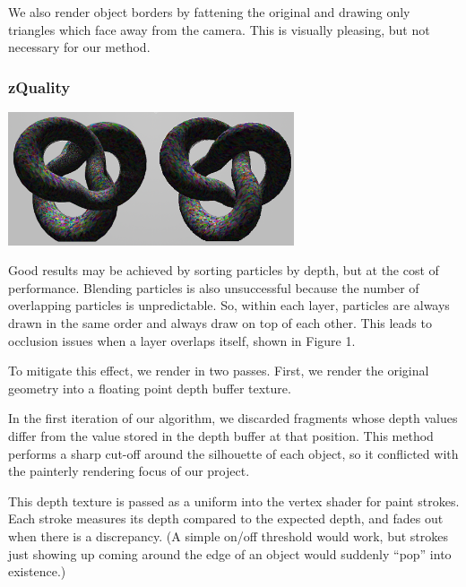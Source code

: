 \documentclass[conference]{acmsiggraph}
\begin{document}
We also render object borders by fattening the original and drawing only
triangles which face away from the camera. This is visually pleasing, but not
necessary for our method.


\subsubsection{zQuality}


\begin{minipage}{\linewidth}%
  \includegraphics[width=3.32in]{images/torus_depth_test_demo}
  \label{visina8}
\end{minipage}


Good results may be achieved by sorting particles by depth, but at the cost of
performance. Blending particles is also unsuccessful because the number of
overlapping particles is unpredictable. So, within each layer, particles are
always drawn in the same order and always draw on top of each other. This leads
to occlusion issues when a layer overlaps itself, shown in Figure 1.

To mitigate this effect, we render in two passes. First, we render the original
geometry into a floating point depth buffer texture.

In the first iteration of our algorithm, we discarded fragments whose depth
values differ from the value stored in the depth buffer at that position. This
method performs a sharp cut-off around the silhouette of each object, so it
conflicted with the painterly rendering focus of our project.

This depth texture is passed as a uniform into the vertex shader for paint
strokes. Each stroke measures its depth compared to the expected depth, and
fades out when there is a discrepancy. (A simple on/off threshold would work,
but strokes just showing up coming around the edge of an object would suddenly
``pop'' into existence.)
\end{document}
